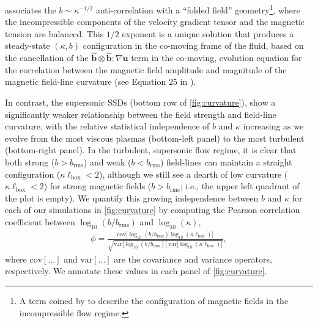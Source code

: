 \documentclass[12pt,twoside]{extreport}
\newcommand{\mVector}[1]{\bm{#1}} %
\newcommand{\ie}{i.e.,\xspace} %
\begin{document}
\citet{schekochihin2004simulations} associates the $b \sim \kappa^{-1/2}$ anti-correlation with a ``folded field'' geometry\footnote{
    A term coined by \citet{schekochihin2004simulations} to describe the configuration of magnetic fields in the incompressible flow regime.
}, where the incompressible components of the velocity gradient tensor \citep[see][]{beattie2023bulk} and the magnetic tension are balanced. This $1/2$ exponent is a unique solution that produces a steady-state $(\kappa, b)$ configuration in the co-moving frame of the fluid, based on the cancellation of the $\widehat{\mVector{b}}\otimes\widehat{\mVector{b}}:\nabla\mVector{u}$ term in the co-moving, evolution equation for the correlation between the magnetic field amplitude and magnitude of the magnetic field-line curvature (see Equation 25 in \citealt{schekochihin2004simulations}).

In contrast, the supersonic SSDs (bottom row of \autoref{fig:curvature}), show a significantly weaker relationship between the field strength and field-line curvature, with the relative statistical independence of $b$ and $\kappa$ increasing as we evolve from the most viscous plasmas (bottom-left panel) to the most turbulent (bottom-right panel). In the turbulent, supersonic flow regime, it is clear that both strong ($b > b_\mathrm{rms}$) and weak ($b < b_\mathrm{rms}$) field-lines can maintain a straight configuration ($\kappa \ell_\mathrm{box} < 2$), although we still see a dearth of low curvature ($\kappa \ell_\mathrm{box} < 2$) for strong magnetic fields ($b > b_\mathrm{rms}$; \ie the upper left quadrant of the plot is empty). We quantify this growing independence between $b$ and $\kappa$ for each of our simulations in \autoref{fig:curvature} by computing the Pearson correlation coefficient between $\log_{10}(b/b_{\mathrm{rms}})$ and $\log_{10}(\kappa)$,
\begin{align}\label{eq:pearson_correlation}
    \phi = \frac{
            \mathrm{cov}\big[ \log_{10}(b/b_{\mathrm{rms}}) \log_{10}(\kappa\ell_{\mathrm{box}}) \big]
        }{
            \sqrt{
                \mathrm{var}\big[ \log_{10}(b/b_{\mathrm{rms}}) \big]
                \, \mathrm{var}\big[ \log_{10}(\kappa\ell_{\mathrm{box}}) \big]
            }
        }
        ,
\end{align}
where $\mathrm{cov}[\hdots]$ and $\mathrm{var}[\hdots]$ are the covariance and variance operators, respectively. We annotate these values in each panel of \autoref{fig:curvature}.
\end{document}
